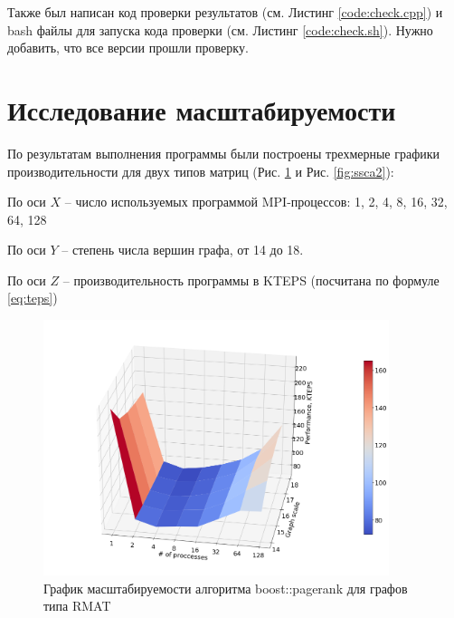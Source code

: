 \documentclass[12pt, a4paper]{article}
\begin{document}
        Также был написан код проверки результатов (см. Листинг \ref{code:check.cpp}) и bash файлы для запуска кода проверки (см. Листинг \ref{code:check.sh}). Нужно добавить, что все версии прошли проверку.

    \section{Исследование масштабируемости}
        По результатам выполнения программы были построены трехмерные графики производительности для двух типов матриц (Рис. \ref{fig:rmat} и Рис. \ref{fig:ssca2}):

        По оси $X$ -- число используемых программой MPI-процессов: 1, 2, 4, 8, 16, 32, 64, 128

        По оси $Y$ -- степень числа вершин графа, от 14 до 18.

        По оси $Z$ -- производительность программы в KTEPS (посчитана по формуле \ref{eq:teps})

        \begin{figure}[h!]
            \centering
            \includegraphics[width=0.9\textwidth]{pics/RMAT}
            \caption{График масштабируемости алгоритма boost::pagerank для графов типа RMAT}
            \label{fig:rmat}
        \end{figure}
\end{document}
